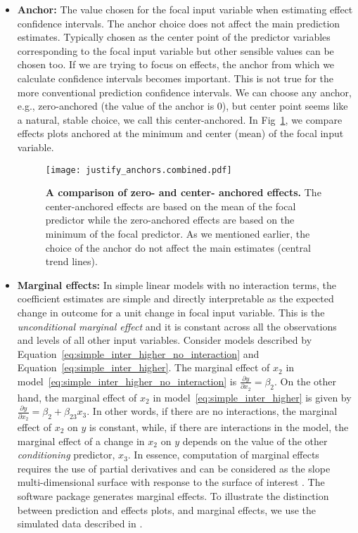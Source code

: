 \begin{itemize}
\item \textbf{Anchor:} The value chosen for the focal input variable when estimating effect confidence intervals. The anchor choice does not affect the main prediction estimates. Typically chosen as the center point of the predictor variables corresponding to the focal input variable but other sensible values can be chosen too. If we are trying to focus on effects, the anchor from which we calculate confidence intervals becomes important. This is not true for the more conventional prediction confidence intervals. We can choose any anchor, e.g., zero-anchored (the value of the anchor is $0$), but center point seems like a natural, stable choice, we call this center-anchored. In Fig~\ref{fig:justify_anchors}, we compare effects plots anchored at the minimum and center (mean) of the focal input variable.
%
\begin{figure}
\begin{center}
\texttt{[image: justify\_anchors.combined.pdf]}
\end{center}
\caption{{\bf A comparison of zero- and center- anchored effects.} The center-anchored effects are based on the mean of the focal predictor while the zero-anchored effects are based on the minimum of the focal predictor. As we mentioned earlier, the choice of the anchor do not affect the main estimates (central trend lines). } 
\label{fig:justify_anchors}
\end{figure}
%
\item \textbf{Marginal effects:} In simple linear models with no interaction terms, the coefficient estimates are simple and directly interpretable as the expected change in outcome for a unit change in focal input variable. This is the \emph{unconditional marginal effect} and it is constant across all the observations and levels of all other input variables. Consider models described by Equation~\ref{eq:simple_inter_higher_no_interaction} and Equation~\ref{eq:simple_inter_higher}. The marginal effect of $x_2$ in model~\ref{eq:simple_inter_higher_no_interaction} is $\frac{\partial y}{\partial x_2} = \beta_2$. On the other hand, the marginal effect of $x_2$ in model~\ref{eq:simple_inter_higher} is given by $\frac{\partial y}{\partial x_2} = \beta_2 + \beta_{23}x_3$. In other words, if there are no interactions, the marginal effect of $x_2$ on $y$ is constant, while, if there are interactions in the model, the marginal effect of a change in $x_2$ on $y$ depends on the value of the other \emph{conditioning} predictor, $x_3$. In essence, computation of marginal effects requires the use of partial derivatives and can be considered as the slope multi-dimensional surface with response to the surface of interest \cite{leeper2017interpreting}. The  software package  \cite{lenth2018package} generates marginal effects. To illustrate the distinction between prediction and effects plots, and marginal effects, we use the simulated data described in . 

\end{itemize}
